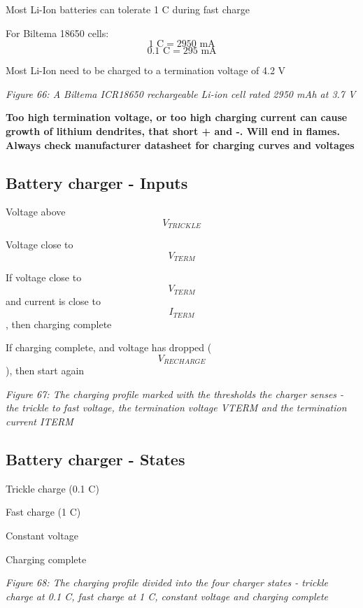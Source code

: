 Most Li-Ion batteries can tolerate 1 C during fast charge

For Biltema 18650 cells: \[ 1\text{ C} = 2950\text{ mA}\]
\[ 0.1\text{ C} = 295\text{ mA}\]

Most Li-Ion need to be charged to a termination voltage of 4.2 V


{
\centering
{}
}

\emph{Figure 66: A Biltema ICR18650 rechargeable Li-ion cell rated 2950
mAh at 3.7 V}

\textbf{Too high termination voltage, or too high charging current can
cause growth of lithium dendrites, that short + and -. Will end in
flames. Always check manufacturer datasheet for charging curves and
voltages}

\subsection{Battery charger - Inputs}\label{battery-charger---inputs}

Voltage above \[V_{TRICKLE}\]

Voltage close to \[V_{TERM}\]

If voltage close to \[V_{TERM}\] and current is close to \[I_{TERM}\],
then charging complete

If charging complete, and voltage has dropped (\[V_{RECHARGE}\]), then
start again


{
\centering
{}
}

\emph{Figure 67: The charging profile marked with the thresholds the
charger senses - the trickle to fast voltage, the termination voltage
VTERM and the termination current ITERM}

\subsection{Battery charger - States}\label{battery-charger---states}

Trickle charge (0.1 C)

Fast charge (1 C)

Constant voltage

Charging complete


{
\centering
{}
}

\emph{Figure 68: The charging profile divided into the four charger
states - trickle charge at 0.1 C, fast charge at 1 C, constant voltage
and charging complete}


